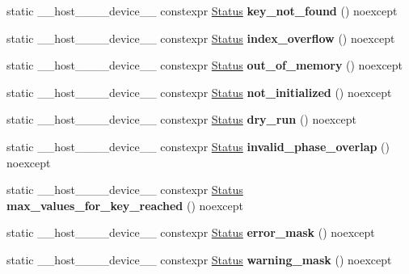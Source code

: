 \begin{DoxyCompactItemize}
\item 
\mbox{\label{classwarpcore_1_1Status_a8e176acb5cfd8b1b026b88a444e34ab1}} 
static \+\_\+\+\_\+host\+\_\+\+\_\+\+\_\+\+\_\+device\+\_\+\+\_\+ constexpr \hyperlink{classwarpcore_1_1Status}{Status} {\bfseries key\+\_\+not\+\_\+found} () noexcept
\item 
\mbox{\label{classwarpcore_1_1Status_a4e4781413f6a4fa4591849823b4bc271}} 
static \+\_\+\+\_\+host\+\_\+\+\_\+\+\_\+\+\_\+device\+\_\+\+\_\+ constexpr \hyperlink{classwarpcore_1_1Status}{Status} {\bfseries index\+\_\+overflow} () noexcept
\item 
\mbox{\label{classwarpcore_1_1Status_a824c87b7a9603002bb3371a0430c7d9e}} 
static \+\_\+\+\_\+host\+\_\+\+\_\+\+\_\+\+\_\+device\+\_\+\+\_\+ constexpr \hyperlink{classwarpcore_1_1Status}{Status} {\bfseries out\+\_\+of\+\_\+memory} () noexcept
\item 
\mbox{\label{classwarpcore_1_1Status_a8f8d84042630b330c067fe949bd69f56}} 
static \+\_\+\+\_\+host\+\_\+\+\_\+\+\_\+\+\_\+device\+\_\+\+\_\+ constexpr \hyperlink{classwarpcore_1_1Status}{Status} {\bfseries not\+\_\+initialized} () noexcept
\item 
\mbox{\label{classwarpcore_1_1Status_a0c313350775cb900b09ccd2c8700f0e2}} 
static \+\_\+\+\_\+host\+\_\+\+\_\+\+\_\+\+\_\+device\+\_\+\+\_\+ constexpr \hyperlink{classwarpcore_1_1Status}{Status} {\bfseries dry\+\_\+run} () noexcept
\item 
\mbox{\label{classwarpcore_1_1Status_a505789f0664da76505349786a65625eb}} 
static \+\_\+\+\_\+host\+\_\+\+\_\+\+\_\+\+\_\+device\+\_\+\+\_\+ constexpr \hyperlink{classwarpcore_1_1Status}{Status} {\bfseries invalid\+\_\+phase\+\_\+overlap} () noexcept
\item 
\mbox{\label{classwarpcore_1_1Status_a40ef052af5ae66685709db74f6b53b1d}} 
static \+\_\+\+\_\+host\+\_\+\+\_\+\+\_\+\+\_\+device\+\_\+\+\_\+ constexpr \hyperlink{classwarpcore_1_1Status}{Status} {\bfseries max\+\_\+values\+\_\+for\+\_\+key\+\_\+reached} () noexcept
\item 
\mbox{\label{classwarpcore_1_1Status_aa9e389f317c5265870495956e1915cf7}} 
static \+\_\+\+\_\+host\+\_\+\+\_\+\+\_\+\+\_\+device\+\_\+\+\_\+ constexpr \hyperlink{classwarpcore_1_1Status}{Status} {\bfseries error\+\_\+mask} () noexcept
\item 
\mbox{\label{classwarpcore_1_1Status_a05eb746778b13753e34f1f5731f544d7}} 
static \+\_\+\+\_\+host\+\_\+\+\_\+\+\_\+\+\_\+device\+\_\+\+\_\+ constexpr \hyperlink{classwarpcore_1_1Status}{Status} {\bfseries warning\+\_\+mask} () noexcept
\end{DoxyCompactItemize}
